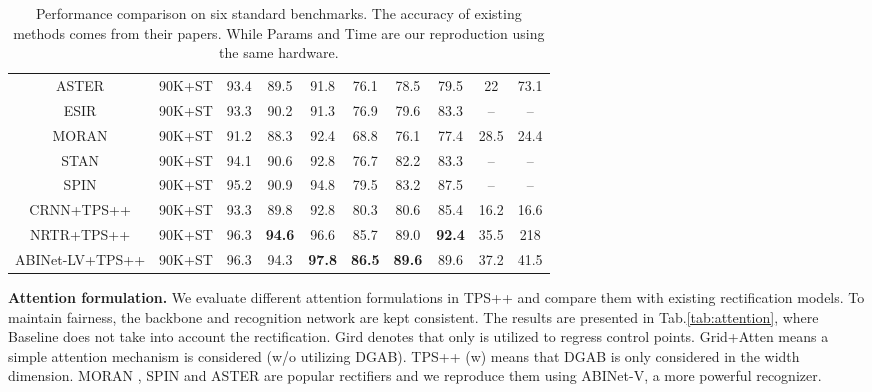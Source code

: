 \documentclass{article}
\begin{document}
\begin{table*}[h]
\begin{tabular}{c|c|c|c|c|c|c|c|c|c}
\hline
ASTER\cite{shi2018aster} & 90K+ST  & 93.4 & 89.5 & 91.8 & 76.1 & 78.5 & 79.5 & 22 & 73.1\\
ESIR\cite{zhan2019esir} & 90K+ST  & 93.3  & 90.2 & 91.3 & 76.9 & 79.6 & 83.3 & -- & -- \\
MORAN\cite{cluo2019moran} & 90K+ST & 91.2 & 88.3 & 92.4 & 68.8 & 76.1 & 77.4 & 28.5 & 24.4\\
STAN\cite{lin2021stan} & 90K+ST & 94.1 & 90.6 & 92.8 & 76.7 & 82.2 & 83.3 & -- & --\\
SPIN\cite{zhang2021spin} & 90K+ST & 95.2 & 90.9 & 94.8 & 79.5 & 83.2 & 87.5 & -- & --\\
\hline
CRNN+TPS++ & 90K+ST &  93.3 & 89.8 & 92.8 & 80.3 & 80.6 & 85.4  &  16.2 & 16.6\\ 
NRTR+TPS++ & 90K+ST & 96.3 & \textbf{94.6} & 96.6 & 85.7 & 89.0 & \textbf{92.4} & 35.5 & 218 \\ 
ABINet-LV+TPS++ & 90K+ST & 96.3 & 94.3 & \textbf{97.8} & \textbf{86.5} & \textbf{89.6} & 89.6 & 37.2 & 41.5 \\ 
\hline
\end{tabular}

\caption{Performance comparison on six standard benchmarks. The accuracy of existing methods comes from their papers. While Params and Time are our reproduction using the same hardware.}
\label{tab:sota}
\end{table*}

\noindent\textbf{Attention formulation.}
We evaluate different attention formulations in TPS++ and compare them with existing rectification models. To maintain fairness, the backbone and recognition network are kept consistent. The results are presented in Tab.\ref{tab:attention}, where Baseline does not take into account the rectification. Gird denotes that only  is utilized to regress control points. Grid+Atten means a simple attention mechanism is considered (w/o utilizing DGAB). TPS++ (w) means that DGAB is only considered in the width dimension. MORAN \cite{cluo2019moran}, SPIN \cite{zhang2021spin} and ASTER \cite{shi2018aster} are popular rectifiers and we reproduce them using ABINet-V, a more powerful recognizer.
\end{document}
